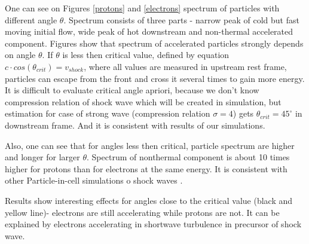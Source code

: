 One can see on Figures \ref{protons} and \ref{electrons} spectrum of particles with different angle $\theta$. Spectrum consists of three parts - narrow peak of cold but fast moving initial flow, wide peak of hot downstream and non-thermal accelerated component. Figures show that spectrum of accelerated particles strongly depends on angle $\theta$. If $\theta$ is less then critical value, defined by equation $c\cdot cos(\theta_{crit})=v_{shock}$, where all values are measured in upstream rest frame, particles can escape from the front and cross it several times to gain more energy. It is difficult to evaluate critical angle apriori, because we don't know compression relation of shock wave which will be created in simulation, but estimation for case of strong wave (compression relation $\sigma=4$) gets $\theta_{crit}=45^{\circ}$ in downstream frame. And it is consistent with results of our simulations.

Also, one can see that for angles less then critical, particle spectrum are higher and longer for larger $\theta$. Spectrum of nonthermal component is about 10 times higher for protons than for electrons at the same energy. It is consistent with other Particle-in-cell simulations o shock waves {\cite{Sironi2011}}.

Results show interesting effects for angles close to the critical value (black and yellow line)- electrons are still accelerating while protons are not. It can be explained by electrons accelerating in shortwave turbulence in precursor of shock wave.



